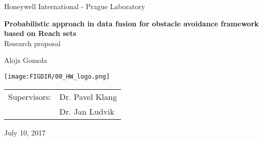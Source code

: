 \pagestyle{empty}
\begin{center}

\large{Honeywell International - Prague Laboratory}

\vspace{3cm}
{\Huge\bfseries Probabilistic approach in data fusion for obstacle avoidance framework based on Reach sets}
\vspace{2.2cm}\\
{\LARGE Research proposal}

\vspace{1cm}
{\LARGE Alojz Gomola}


\vspace{5cm}
\centerline{\mbox{\texttt{[image: \\FIGDIR/00\_HW\_logo.png]}}}


\vspace{2cm}


\vspace{1.5cm}
\begin{tabular}{rl}  
\noalign{\vspace{2mm}}
Supervisors: & Dr. Pavel Klang\\
\noalign{\vspace{2mm}}
& Dr. Jan Ludvik\\ 
\end{tabular}

\vspace{2cm}
{July 10, 2017}
\end{center}

\newpage
\openright

\pagestyle{plain}
\setcounter{page}{1}

\tableofcontents


\newpage
\listoffigures

\newpage
\listoftables